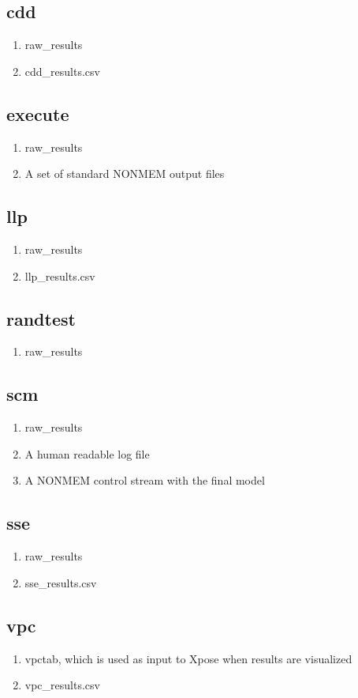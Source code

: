 \subsection{cdd}
\begin{enumerate}
\item raw\_results 
\item cdd\_results.csv 
\end{enumerate}
\subsection{execute}
\begin{enumerate}
\item raw\_results
\item A set of standard NONMEM output files
\end{enumerate}
\subsection{llp}
\begin{enumerate}
\item raw\_results 
\item llp\_results.csv 
\end{enumerate}
\subsection{randtest}
\begin{enumerate}
\item raw\_results 
\end{enumerate}
\subsection{scm}
\begin{enumerate}
\item raw\_results
\item A human readable log file
\item A NONMEM control stream with the final model
\end{enumerate}
\subsection{sse}
\begin{enumerate}
\item raw\_results 
\item sse\_results.csv 
\end{enumerate}
\subsection{vpc}
\begin{enumerate}
\item vpctab, which is used as input to Xpose when results are visualized
\item vpc\_results.csv 
\end{enumerate}


